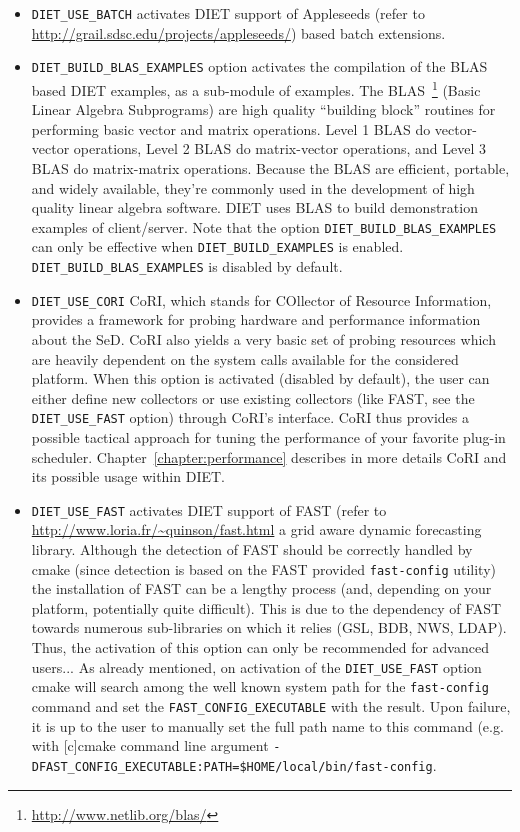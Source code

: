 \begin{itemize}
\item
  \verb+DIET_USE_BATCH+ activates DIET support of Appleseeds (refer to
  \url{http://grail.sdsc.edu/projects/appleseeds/}) based batch
  extensions.

\item
  \verb+DIET_BUILD_BLAS_EXAMPLES+ option activates the compilation of
  the BLAS based DIET examples, as a sub-module of examples.
  The BLAS~\footnote{\url{http://www.netlib.org/blas/}} (Basic Linear
  Algebra Subprograms) are high quality ``building block'' routines for
  performing basic vector and matrix operations.
  Level 1 BLAS do vector-vector operations, Level 2 BLAS do matrix-vector
  operations, and Level 3 BLAS do matrix-matrix operations.
  Because the BLAS are efficient, portable, and widely available,
  they're commonly used in the development of high quality linear algebra
  software.
  DIET uses BLAS to build demonstration examples of client/server.
  Note that the option \verb+DIET_BUILD_BLAS_EXAMPLES+ can only be
  effective when \verb+DIET_BUILD_EXAMPLES+ is enabled.
  \verb+DIET_BUILD_BLAS_EXAMPLES+ is disabled by default.

\item
  \verb+DIET_USE_CORI+ CoRI, which stands for COllector of Resource
  Information, provides a framework for probing hardware and performance
  information about the SeD.
  CoRI also yields a very basic set of probing resources which are
  heavily dependent on the system calls available for the considered platform.
  When this option is activated (disabled by default), the user can either
  define new collectors or use existing collectors (like FAST, see the
  \verb+DIET_USE_FAST+ option) through CoRI's interface.
  CoRI thus provides a possible tactical approach for tuning the performance
  of your favorite plug-in scheduler.
  Chapter~\ref{chapter:performance} describes in more details CoRI and its
  possible usage within DIET.

\item
  \verb+DIET_USE_FAST+ activates DIET support of FAST (refer to
  \url{http://www.loria.fr/~quinson/fast.html} a grid aware dynamic
  forecasting library.
  Although the detection of FAST should be correctly handled by cmake
  (since detection is based on the FAST provided \verb+fast-config+ utility)
  the installation of FAST can be a lengthy process (and, depending on your
  platform, potentially quite difficult).
  This is due to the dependency of FAST towards numerous sub-libraries on
  which it relies (GSL, BDB, NWS, LDAP).
  Thus, the activation of this option can only be recommended for advanced
  users...
  As already mentioned, on activation of the \verb+DIET_USE_FAST+ option
  cmake will search among the well known system path for the
  \verb+fast-config+ command and set the \verb+FAST_CONFIG_EXECUTABLE+ 
  with the result. Upon failure, it is up to the user to manually set the
  full path name to this command (e.g. with [c]cmake command line argument
  \verb+-DFAST_CONFIG_EXECUTABLE:PATH=$HOME/local/bin/fast-config+.


\end{itemize}

